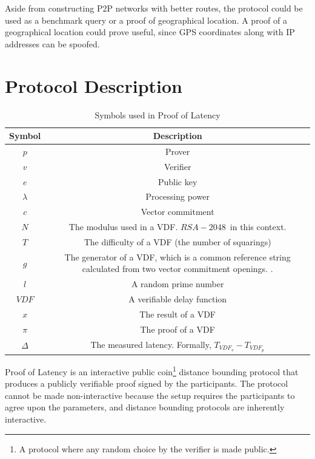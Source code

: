 Aside from constructing P2P networks with better routes, the protocol could be used as a benchmark query or a proof of geographical location. A proof of a geographical location could prove useful, since GPS coordinates along with IP addresses can be spoofed.

\section{Protocol Description}
\begin{table}[h!]
	\centering
	\begin{tabular}{ c|c  }
		Symbol        & Description                                             \\
		\hline
		\( p \)       & Prover                                                  \\
		\( v \)       & Verifier                                                \\
		\( e \)      & Public key                                              \\
		\( \lambda \) & Processing power                                        \\
		\( c \)       & Vector commitment                                       \\
		\( N \)       & The modulus used in a VDF. \(RSA-2048\)~in this context.   \\

		\( T \)       & The difficulty of a VDF (the number of squarings)       \\
		\( g \)       & The generator of a VDF, which is a common reference string calculated from two vector commitment openings.							.          \\
		\( l \)       & A random prime number                                   \\
		\( VDF \)     & A verifiable delay function                             \\
		\( x \)       & The result of a VDF                                     \\
		\(\pi \)      & The proof of a VDF                                      \\
		\(\Delta\)    & The measured latency. Formally, \(T_{VDF_v} - T_{VDF_p}\) \\
	\end{tabular}
	\caption{Symbols used in Proof of Latency}
	\label{table:1}
\end{table}

Proof of Latency is an interactive public coin\footnote{A protocol where any random choice by the verifier is made public.} distance bounding protocol that produces a publicly verifiable proof signed by the participants. The protocol cannot be made non-interactive because the setup requires the participants to agree upon the parameters, and distance bounding protocols are inherently interactive.

